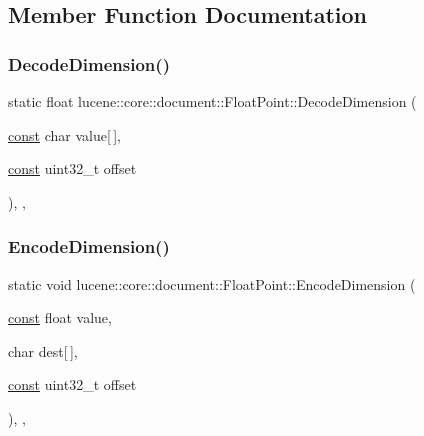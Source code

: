 \subsection{Member Function Documentation}
\mbox{\label{classlucene_1_1core_1_1document_1_1FloatPoint_adda5c047a340264e4d10e8a47fe513ba}} 
\subsubsection{\texorpdfstring{Decode\+Dimension()}{DecodeDimension()}}
{\footnotesize\ttfamily static float lucene\+::core\+::document\+::\+Float\+Point\+::\+Decode\+Dimension (\begin{DoxyParamCaption}\item[{\mbox{\hyperlink{ZlibCrc32_8h_a2c212835823e3c54a8ab6d95c652660e}{const}} char}]{value\mbox{[}$\,$\mbox{]},  }\item[{\mbox{\hyperlink{ZlibCrc32_8h_a2c212835823e3c54a8ab6d95c652660e}{const}} uint32\+\_\+t}]{offset }\end{DoxyParamCaption})\hspace{0.3cm}{\ttfamily [inline]}, {\ttfamily [static]}, {\ttfamily [noexcept]}}

\mbox{\label{classlucene_1_1core_1_1document_1_1FloatPoint_ab8494f2f0e931bec1fdf34dec7954db9}} 
\subsubsection{\texorpdfstring{Encode\+Dimension()}{EncodeDimension()}}
{\footnotesize\ttfamily static void lucene\+::core\+::document\+::\+Float\+Point\+::\+Encode\+Dimension (\begin{DoxyParamCaption}\item[{\mbox{\hyperlink{ZlibCrc32_8h_a2c212835823e3c54a8ab6d95c652660e}{const}} float}]{value,  }\item[{char}]{dest\mbox{[}$\,$\mbox{]},  }\item[{\mbox{\hyperlink{ZlibCrc32_8h_a2c212835823e3c54a8ab6d95c652660e}{const}} uint32\+\_\+t}]{offset }\end{DoxyParamCaption})\hspace{0.3cm}{\ttfamily [inline]}, {\ttfamily [static]}, {\ttfamily [noexcept]}}


